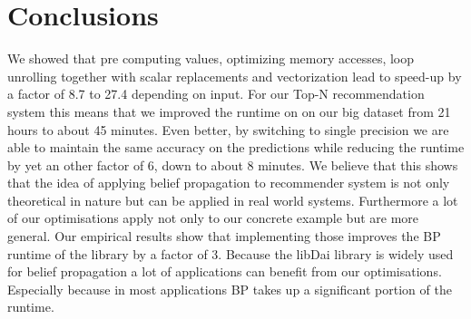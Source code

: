 \section{Conclusions}
We showed that pre computing values, optimizing memory accesses, loop unrolling together with scalar replacements and vectorization lead to speed-up by a factor of 8.7 to 27.4 depending on input. For our Top-N recommendation system this means that we improved the runtime on on our big dataset from 21 hours to about 45 minutes. Even better, by switching to single precision we are able to maintain the same accuracy on the predictions while reducing the runtime by yet an other factor of 6, down to about 8 minutes. We believe that this shows that the idea of applying belief propagation to recommender system is not only theoretical in nature but can be applied in real world systems. Furthermore a lot of our optimisations apply not only to our concrete example but are more general. Our empirical results show that implementing those improves the BP runtime of the library by a factor of 3. Because the libDai library is widely used for belief propagation a lot of applications can benefit from our optimisations. Especially because in most applications BP takes up a significant portion of the runtime.